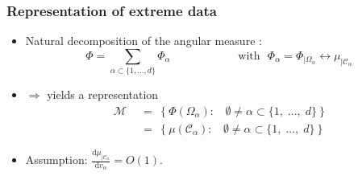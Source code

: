 \documentclass[9pt]{beamer}
\newcommand{\ud}{\text{d}{}}
\newcommand\red{\color{red} }
\def\mb{\mathbf}
\begin{document}
\begin{frame}
  \frametitle{Representation of extreme data}
\begin{itemize}
\item Natural decomposition of the angular measure :
$$
\Phi = \sum_{\alpha\subset\{1,\dotsc,d\}} \Phi_\alpha \text{~~~~~~~~~~~~~~~~~~with~~} \Phi_\alpha = \Phi_{|\Omega_\alpha} \leftrightarrow \mu_{|\mathcal{C}_\alpha}
$$


\item $\Rightarrow$ yields a representation
{\red
\begin{align*}
\mathcal{M} ~~&=~~ \Big\{~\Phi(\Omega_{\alpha}):~~~~ \emptyset \neq \alpha\subset\{1,\; \ldots,\; d \}~\Big\}  \\
&=~~ \Big\{~\mu(\mathcal{C}_{\alpha}):~~~~ \emptyset \neq \alpha\subset\{1,\; \ldots,\; d \}~\Big\}
\end{align*}
}  

\item Assumption:  %
$\frac{\ud \mu_{|\mathcal{C}_\alpha}}{\ud v_\alpha} = O(1)$.\\~\\
 
\end{itemize}


\end{frame}
\end{document}

